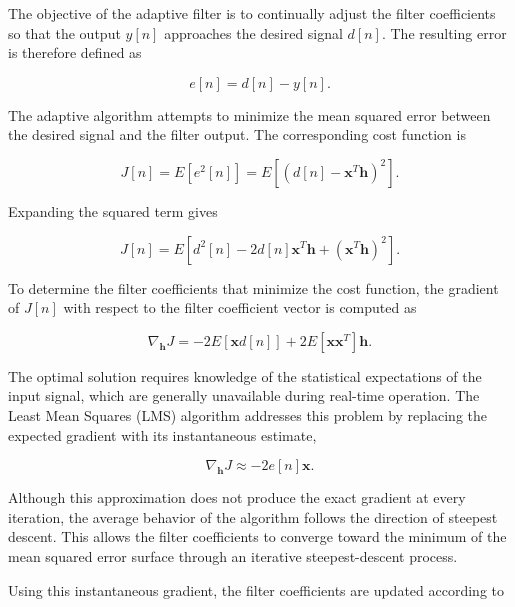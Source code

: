 The objective of the adaptive filter is to continually adjust the filter coefficients so that the output $y[n]$ approaches the desired signal $d[n]$. The resulting error is therefore defined as

\begin{equation}
e[n] = d[n] - y[n].
\end{equation}

The adaptive algorithm attempts to minimize the mean squared error between the desired signal and the filter output. The corresponding cost function is

\begin{equation}
J[n] = E\left[e^2[n]\right]
= E\left[\left(d[n]-\mathbf{x}^{T}\mathbf{h}\right)^2\right].
\end{equation}

Expanding the squared term gives

\begin{equation}
J[n] = E\left[d^2[n]-2d[n]\mathbf{x}^{T}\mathbf{h}
+\left(\mathbf{x}^{T}\mathbf{h}\right)^2\right].
\end{equation}

To determine the filter coefficients that minimize the cost function, the gradient of $J[n]$ with respect to the filter coefficient vector is computed as

\begin{equation}
\nabla_{\mathbf{h}} J
=
-2E\left[\mathbf{x}d[n]\right]
+
2E\left[\mathbf{x}\mathbf{x}^{T}\right]\mathbf{h}.
\end{equation}

The optimal solution requires knowledge of the statistical expectations of the input signal, which are generally unavailable during real-time operation. The Least Mean Squares (LMS) algorithm addresses this problem by replacing the expected gradient with its instantaneous estimate,

\begin{equation}
\nabla_{\mathbf{h}} J
\approx
-2e[n]\mathbf{x}.
\end{equation}

Although this approximation does not produce the exact gradient at every iteration, the average behavior of the algorithm follows the direction of steepest descent. This allows the filter coefficients to converge toward the minimum of the mean squared error surface through an iterative steepest-descent process.

Using this instantaneous gradient, the filter coefficients are updated according to

